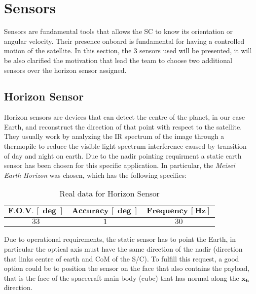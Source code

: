 \section{Sensors}
\label{sec:sensors}

Sensors are fundamental tools that allows the SC to know its orientation or angular velocity. Their presence onboard 
is fundamental for having a controlled motion of the satellite. In this section, the 3 sensors used will be presented, 
it will be also clarified the motivation that lead the team to choose two additional sensors over the horizon sensor 
assigned. 

\subsection{Horizon Sensor}
\label{subsec:horizon_sensor}

Horizon sensors are devices that can detect the centre of the planet, in our case Earth, and reconstruct the direction 
of that point with respect to the satellite. They usually work by analyzing the IR spectrum of the image through a thermopile
to reduce the visible light spectrum interference caused by transition of day and night on earth. 
Due to the nadir pointing requirment a static earth sensor has been chosen for this specific application. In particular, the 
\textit{Meisei Earth Horizon} was chosen, which has the following specifics:

\begin{table}[H]

    \centering
    \begin{tabular}{|c|c|c|}
    \hline
    $\bm{F.O.V. \, [\deg]}$ & $\bm{Accuracy \, [\deg]}$ & $\bm{Frequency \, [Hz]}$ \\
    \hline
    $33$ & $1$ & $30$  \\
    \hline
    \end{tabular}
    
    \caption{Real data for Horizon Sensor}
    \label{table:Hor_sensor}
    
\end{table}

Due to operational requirements, the static sensor has to point the Earth, in particular the optical
axis must have the same direction of the nadir (direction that links centre of earth and CoM of the S/C).
To fulfill this request, a good option could be to position the sensor on the face that also contains the 
payload, that is the face of the spacecraft main body (cube) that has normal along the $\boldsymbol{x_b}$ 
direction. 

